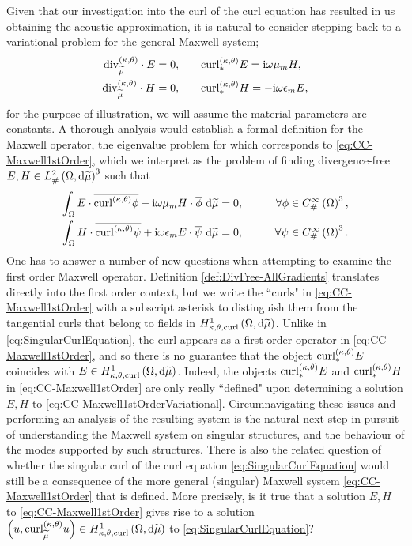 Given that our investigation into the curl of the curl equation has resulted in us obtaining the acoustic approximation, it is natural to consider stepping back to a variational problem for the general Maxwell system;
\begin{subequations} \label{eq:CC-Maxwell1stOrder}
	\begin{align}
		\mathrm{div}_{\widetilde{\mu}}^{\left( \kappa, \theta \right)}\cdot E = 0,
		&\qquad
		\mathrm{curl}_{*}^{\left( \kappa, \theta \right)}E = \mathrm{i}\omega\mu_m H, \\
		\mathrm{div}_{\widetilde{\mu}}^{\left( \kappa, \theta \right)}\cdot H = 0,
		&\qquad
		\mathrm{curl}_{*}^{\left( \kappa, \theta \right)}H = -\mathrm{i}\omega\epsilon_m E,
	\end{align}
\end{subequations}
for the purpose of illustration, we will assume the material parameters are constants. 
A thorough analysis would establish a formal definition for the Maxwell operator, the eigenvalue problem for which corresponds to \eqref{eq:CC-Maxwell1stOrder}, which we interpret as the problem of finding divergence-free $E,H\in L^2_{\#}\left( \Omega,\mathrm{d} \widetilde{\mu} \right)^3$ such that
\begin{subequations} \label{eq:CC-Maxwell1stOrderVariational}
	\begin{align} 
		\int_{\Omega} E\cdot\overline{\mathrm{curl}_{}^{\left( \kappa, \theta \right)}\phi} - \mathrm{i}\omega\mu_m H\cdot\overline{\phi}  \ \mathrm{d}\widetilde{\mu} &= 0, 
		\qquad &\forall \phi\in C^{\infty}_{\#}\left( \Omega \right)^3, \\
		\int_{\Omega} H\cdot\overline{\mathrm{curl}_{}^{\left( \kappa, \theta \right)}\psi} + \mathrm{i}\omega\epsilon_m E\cdot\overline{\psi}  \ \mathrm{d}\widetilde{\mu} &= 0,
		\qquad &\forall \psi\in C^{\infty}_{\#}\left( \Omega \right)^3.
	\end{align}
\end{subequations}
One has to answer a number of new questions when attempting to examine the first order Maxwell operator.
Definition \ref{def:DivFree-AllGradients} translates directly into the first order context, but we write the ``curls" in \eqref{eq:CC-Maxwell1stOrder} with a subscript asterisk to distinguish them from the tangential curls that belong to fields in $H^1_{\kappa,\theta,\mathrm{curl}}\left( \Omega, \mathrm{d}\widetilde{\mu} \right)$.
Unlike in \eqref{eq:SingularCurlEquation}, the curl appears as a first-order operator in \eqref{eq:CC-Maxwell1stOrder}, and so there is no guarantee that the object $\mathrm{curl}_{*}^{\left( \kappa, \theta \right)}E$ coincides with $E\in H^1_{\kappa,\theta,\mathrm{curl}}\left( \Omega, \mathrm{d}\widetilde{\mu} \right)$.
Indeed, the objects $\mathrm{curl}_{*}^{\left( \kappa, \theta \right)}E$ and $\mathrm{curl}_{*}^{\left( \kappa, \theta \right)}H$ in \eqref{eq:CC-Maxwell1stOrder} are only really ``defined" upon determining a solution $E,H$ to \eqref{eq:CC-Maxwell1stOrderVariational}.
Circumnavigating these issues and performing an analysis of the resulting system is the natural next step in pursuit of understanding the Maxwell system on singular structures, and the behaviour of the modes supported by such structures.
There is also the related question of whether the singular curl of the curl equation \eqref{eq:SingularCurlEquation} would still be a consequence of the more general (singular) Maxwell system \eqref{eq:CC-Maxwell1stOrder} that is defined.
More precisely, is it true that a solution $E,H$ to \eqref{eq:CC-Maxwell1stOrder} gives rise to a solution $\left( u, \mathrm{curl}_{\widetilde{\mu}}^{\left( \kappa, \theta \right)}u  \right)\in H^1_{\kappa,\theta,\mathrm{curl}}\left( \Omega, \mathrm{d}\widetilde{\mu} \right)$ to \eqref{eq:SingularCurlEquation}? 